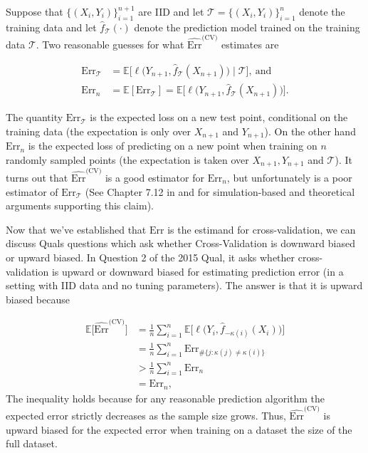 Suppose that $ \{(X_i,Y_i) \}_{i=1}^{n+1}$ are IID and let $\mathcal{T} =  \{(X_i,Y_i )\}_{i=1}^{n}$ denote the training data and let $\hat{f}_{\mathcal{T}}(\cdot)$ denote the prediction model trained on the training data $\mathcal{T}$. Two reasonable guesses for what $\widehat{\text{Err}}^{\text{(CV)}}$ estimates are 

\begin{align*}\text{Err}_{\mathcal{T}}& = \mathbb{E} \Big[ \ell \Big( Y_{n+1} , \hat{f}_{\mathcal{T}}(X_{n+1}) \Big) \mid \mathcal{T} \Big], \ \text{and}\\
     \text{Err}_n &= \mathbb{E}[\text{Err}_{\mathcal{T}}] = \mathbb{E} \Big[ \ell \Big( Y_{n+1} , \hat{f}_{\mathcal{T}}(X_{n+1}) \Big)\Big].
\end{align*}

The quantity $\text{Err}_{\mathcal{T}}$ is the expected loss on a new test point, conditional on the training data (the expectation is only over $X_{n+1}$ and $Y_{n+1}$). On the other hand $\text{Err}_n$ is the expected loss of predicting on a new point when training on $n$ randomly sampled points (the expectation is taken over $X_{n+1},Y_{n+1}$ and $\mathcal{T}$). It turns out that $\widehat{\text{Err}}^{\text{(CV)}}$ is a good estimator for $\text{Err}_n$, but unfortunately is a poor estimator of $\text{Err}_{\mathcal{T}}$ (See Chapter 7.12 in \cite{hastie2009elements} and \cite{Bates2022CrossVal} for simulation-based and theoretical arguments supporting this claim).

Now that we've established that $\text{Err}$ is the estimand for cross-validation, we can discuss Quals questions which ask whether Cross-Validation is downward biased or upward biased. In Question 2 of the 2015 Qual, it asks whether cross-validation is upward or downward biased for estimating prediction error (in a setting with IID data and no tuning parameters). The answer is that it is upward biased because 

\begin{align*}
    \mathbb{E} \big[ \widehat{\text{Err}}^{\text{(CV)}}  \big] &= \frac{1}{n} \sum_{i=1}^n \mathbb{E} \Big[ \ell \Big( Y_i, \hat{f}_{-\kappa(i)}( X_i) \Big) \Big] \\
    &= \frac{1}{n} \sum_{i=1}^n \text{Err}_{\#\{j : \kappa(j) \neq \kappa(i)\}}\\
    & >  \frac{1}{n} \sum_{i=1}^n  \text{Err}_n\\
    & =  \text{Err}_n,
\end{align*}    
The inequality holds because for any reasonable prediction algorithm the expected error strictly decreases as the sample size grows. Thus, $\widehat{\text{Err}}^{\text{(CV)}}$ is upward biased for the expected error when training on a dataset the size of the full dataset. 

